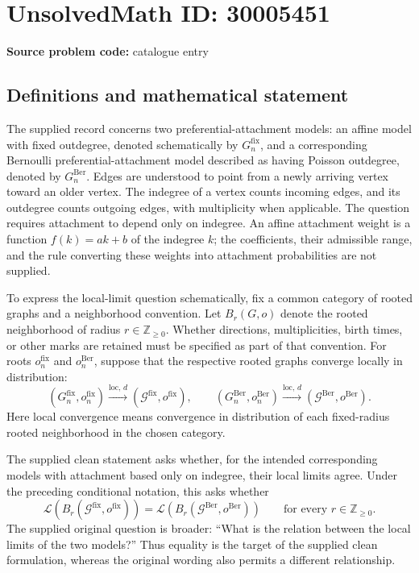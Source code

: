 \documentclass[11pt]{article}
\newcommand{\Z}{\mathbb{Z}}
\begin{document}
\section*{UnsolvedMath ID: 30005451}
\textbf{Source problem code:} catalogue entry
\subsection{Definitions and mathematical statement}
The supplied record concerns two preferential-attachment models: an affine model with fixed outdegree, denoted schematically by \(G_n^{\mathrm{fix}}\), and a corresponding Bernoulli preferential-attachment model described as having Poisson outdegree, denoted by \(G_n^{\mathrm{Ber}}\). Edges are understood to point from a newly arriving vertex toward an older vertex. The indegree of a vertex counts incoming edges, and its outdegree counts outgoing edges, with multiplicity when applicable. The question requires attachment to depend only on indegree. An affine attachment weight is a function \(f(k)=ak+b\) of the indegree \(k\); the coefficients, their admissible range, and the rule converting these weights into attachment probabilities are not supplied.

To express the local-limit question schematically, fix a common category of rooted graphs and a neighborhood convention. Let \(B_r(G,o)\) denote the rooted neighborhood of radius \(r\in\Z_{\geq 0}\). Whether directions, multiplicities, birth times, or other marks are retained must be specified as part of that convention. For roots \(o_n^{\mathrm{fix}}\) and \(o_n^{\mathrm{Ber}}\), suppose that the respective rooted graphs converge locally in distribution:
\[
 (G_n^{\mathrm{fix}},o_n^{\mathrm{fix}})
 \xrightarrow{\mathrm{loc},\,d}(\mathcal G^{\mathrm{fix}},o^{\mathrm{fix}}),
 \qquad
 (G_n^{\mathrm{Ber}},o_n^{\mathrm{Ber}})
 \xrightarrow{\mathrm{loc},\,d}(\mathcal G^{\mathrm{Ber}},o^{\mathrm{Ber}}).
\]
Here local convergence means convergence in distribution of each fixed-radius rooted neighborhood in the chosen category.

The supplied clean statement asks whether, for the intended corresponding models with attachment based only on indegree, their local limits agree. Under the preceding conditional notation, this asks whether
\[
 \mathcal L\!\left(B_r(\mathcal G^{\mathrm{fix}},o^{\mathrm{fix}})\right)
 =
 \mathcal L\!\left(B_r(\mathcal G^{\mathrm{Ber}},o^{\mathrm{Ber}})\right)
 \qquad\text{for every }r\in\Z_{\geq 0}.
\]
The supplied original question is broader: ``What is the relation between the local limits of the two models?'' Thus equality is the target of the supplied clean formulation, whereas the original wording also permits a different relationship.
\end{document}
